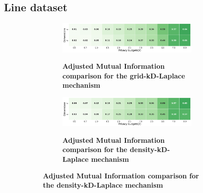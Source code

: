\subsection{Line dataset} \label{appendix:results-mechanism-utility-line-dataset}
\begin{figure}[H]
    \centering
    \begin{subfigure}[b]{0.90\textwidth}
        \begin{subfigure}[c]{1\textwidth}
            \caption{\textbf{Adjusted Mutual Information comparison for the grid-kD-Laplace mechanism}}
            \includegraphics[width=1\textwidth]{Results/kd-laplace/grid-kd-Laplace/line-dataset/ami.png}
            \label{fig:ami_line-dataset_comparison_grid-kd_2d}
        \end{subfigure}
        \vfill %
        \begin{subfigure}[c]{1\textwidth}
            \caption{\textbf{Adjusted Mutual Information comparison for the density-kD-Laplace mechanism}}
            \includegraphics[width=1\textwidth]{Results/kd-laplace/density-kd-Laplace/line-dataset/ami.png}
            \label{fig:ami_line-dataset_comparison_density-kd_2d}
        \end{subfigure}
    \end{subfigure}
    \hfill %
    \begin{subfigure}[b]{0.075\textwidth}

\end{subfigure}
\end{figure}
